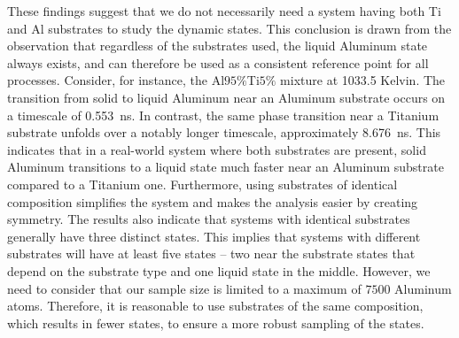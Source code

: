 These findings suggest that we do not necessarily need a system having both Ti and Al substrates to study the dynamic states. This conclusion is drawn from the observation that regardless of the substrates used, the liquid Aluminum state always exists, and can therefore be used as a consistent reference point for all processes. Consider, for instance, the Al$95\%$Ti$5\%$ mixture at 1033.5 Kelvin. The transition from solid to liquid Aluminum near an Aluminum substrate occurs on a timescale of \SI{0.553}{\nano\second}. In contrast, the same phase transition near a Titanium substrate unfolds over a notably longer timescale, approximately \SI{8.676}{\nano\second}. This indicates that in a real-world system where both substrates are present, solid Aluminum transitions to a liquid state much faster near an Aluminum substrate compared to a Titanium one. Furthermore, using substrates of identical composition simplifies the system and makes the analysis easier by creating symmetry. The results also indicate that systems with identical substrates generally have three distinct states. This implies that systems with different substrates will have at least five states -- two near the substrate states that depend on the substrate type and one liquid state in the middle. However, we need to consider that our sample size is limited to a maximum of $7500$ Aluminum atoms. Therefore, it is reasonable to use substrates of the same composition, which results in fewer states, to ensure a more robust sampling of the states.

